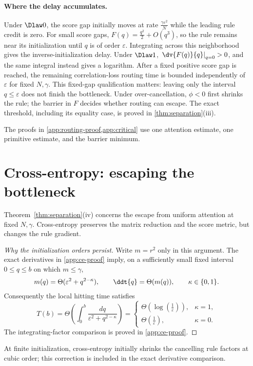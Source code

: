 \paragraph{Where the delay accumulates.}
Under $\Dlaw0$, the score gap initially moves at rate $\tfrac{\gamma \varepsilon^2}{N}$ while the leading rule credit is zero.
For small score gaps, $F(q)=\tfrac{q^2}{2}+O(q^3)$, so the rule remains near its initialization until $q$ is of order $\varepsilon$.
Integrating across this neighborhood gives the inverse-initialization delay.
Under $\Dlaw1$, $\left.\dv{F(q)}{q}\right|_{q=0}>0$, and the same integral instead gives a logarithm.
After a fixed positive score gap is reached, the remaining correlation-loss routing time is bounded independently of $\varepsilon$
for fixed $N,\gamma$. This fixed-gap qualification matters: leaving only the interval $q\le \varepsilon$ does not finish the bottleneck.
Under over-cancellation, $\phi<0$ first shrinks the rule; the barrier in $F$ decides whether routing can escape.
The exact threshold, including its equality case, is proved in \cref{thm:separation}(iii).


The proofs in \cref{app:routing-proof,app:critical} use one attention estimate, one primitive estimate, and the barrier minimum.

\section{Cross-entropy: escaping the bottleneck}
\label{sec:crossentropy}
Theorem~\ref{thm:separation}(iv) concerns the escape from uniform attention at fixed $N,\gamma$.
Cross-entropy preserves the matrix reduction and the score metric, but changes the rule gradient.
\begin{proof}[Why the initialization orders persist]
Write $m=r^2$ only in this argument. The exact derivatives in \cref{app:ce-proof} imply,
on a sufficiently small fixed interval $0\le q\le b$ on which $m\le\gamma$,
\[
 m(q)=\Theta(\varepsilon^2+q^{2-\kappa}),\qquad
 \ddt{q}=\Theta(m(q)),\qquad \kappa\in\{0,1\}.
\]
Consequently the local hitting time satisfies
\[
 T(b)=\Theta\!\left(\int_0^b\frac{dq}{\varepsilon^2+q^{2-\kappa}}\right)
 =\begin{cases}
 \Theta(\log(\tfrac{1}{\varepsilon})),&\kappa=1,\\
 \Theta(\tfrac{1}{\varepsilon}),&\kappa=0.
 \end{cases}
\]
The integrating-factor comparison is proved in \cref{app:ce-proof}.
\end{proof}
At finite initialization, cross-entropy initially shrinks the cancelling rule factors at cubic order;
this correction is included in the exact derivative comparison.

